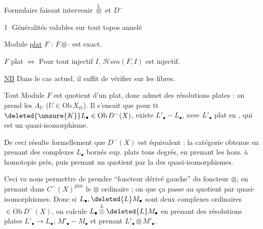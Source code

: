Formulaire faisant intervenir $\overset{\mathbb L}{\otimes}$ et $D^-$

\textcircled{1} Généralités valables sur tout topos annelé

Module \uline{plat} $F$ : $F\otimes\cdot$ est exact.

$F$ plat $\Longleftrightarrow$ Pour tout injectif $I$, $\mathscr Hom(F,I)$ est injectif.

\uline{NB} Dans le cas actuel, il suffit de vérifier sur les fibres.

Tout Module $F$  est quotient d'un plat, donc admet des résolutions plates : on prend les $A_U$ ($U\in\mathrm{Ob}\,X_{\mathrm{ét}}$). Il s'ensuit  que pour tt $\deleted{\unsure{K}}L_{\bullet}\in\mathrm{Ob}\,D^-(X)$, existe  $L'_{\bullet}\mathbin{-}L_{\bullet}$, avec $L'_{\bullet}$ plat en , qui est un quasi-isomorphisme.

De ceci résulte formellement que $D^-(X)$ est équivalent : la catégorie obtenue en prenant  des complexes $L_{\bullet}$ bornés sup. plats  tous degrés,  en prenant les hom. à homotopie près, puis prenant un quotient par la   des quasi-isomorphismes.

Ceci va nous permettre de prendre  ``foncteur dérivé gauche'' du foncteur $\otimes$, en prenant dans $C^-(X)^{\mathrm{plat}}$ le $\otimes$ ordinaire ; on  que ça passe au quotient par quasi-isomorphismes. Donc si $L_{\bullet},\deleted{L}M_{\bullet}$ sont deux complexes ordinaires $\in\mathrm{Ob}\,D^-(X)$, on  calcule $L_{\bullet}\overset{L}{\otimes}\deleted{L}M_{\bullet}$ en prenant des résolutions plates $L'_{\bullet}\longrightarrow{}L_{\bullet}$, $M'_{\bullet}\mathbin{-}M_{\bullet}$ et prenant $L'_{\bullet}\otimes M'_{\bullet}$.
